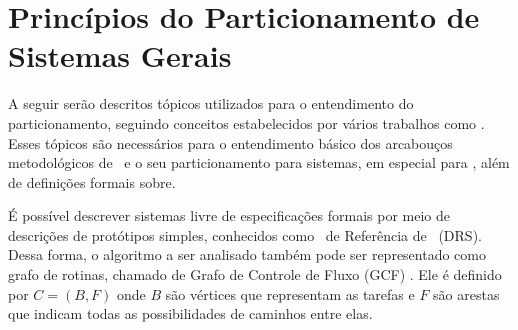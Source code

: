 \section{Princípios do Particionamento de Sistemas Gerais} \label{chap:design}
    
    A seguir serão descritos tópicos utilizados para o entendimento do particionamento, seguindo conceitos estabelecidos por vários trabalhos como \cite{Arato2003, Arato2005, Mann2007, BenHajHassine2017, Sass2010}.
    Esses tópicos são necessários para o entendimento básico dos arcabouços metodológicos de \codesign\ e o seu particionamento para sistemas, em especial para \wearables, além de definições formais sobre.
    
    
    
    É possível descrever sistemas livre de especificações formais por meio de descrições de protótipos simples, conhecidos como \Design\ de Referência de \Software\ (DRS)\cite{Sass2010}.
    Dessa forma, o algoritmo a ser analisado também pode ser representado como grafo de rotinas, chamado de Grafo de Controle de Fluxo (GCF) \cite{Mann2007}.
    Ele é definido por $C = (B, F) \label{eq:subrotina}$
    onde $B$ são vértices que representam as tarefas %
    e $ F $ são arestas que indicam todas as possibilidades de caminhos entre elas.
    
